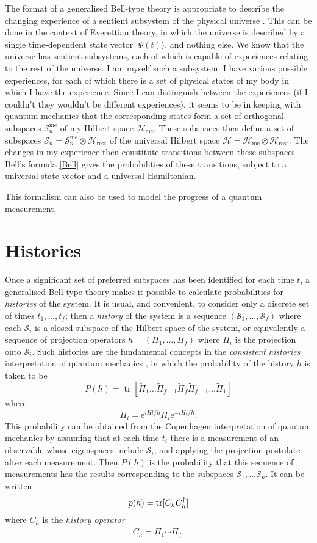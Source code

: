 \documentclass[12pt,a4paper,reqno]{article}
\newcommand{\be}{\begin{equation}}
\newcommand{\ee}{\end{equation}}
\renewcommand{\(}{\left(}
\renewcommand{\)}{\right)}
\renewcommand{\.}{\centerdot}
\newcommand{\e}{\mathrm{e}}
\renewcommand{\S}{\mathcal{S}}
\renewcommand{\H}{\mathcal{H}}
\newcommand{\1}{\mathbf{1}}
\newcommand{\<}{\langle}
\renewcommand{\>}{\rangle}
\newcommand{\tr}{\operatorname{tr}}
\theoremstyle{definition}
\theoremstyle{remark}
\numberwithin{equation}{section}
\newcommand{\Pii}{\widetilde{\Pi}}
\begin{document}
The format of a generalised Bell-type theory is appropriate to describe the changing experience of a sentient subsystem of the physical universe \cite{logicfuture}. This can be done in the context of Everettian theory, in which the universe is described by a single time-dependent state vector $|\Psi(t)\>$, and nothing else. We know that the universe has sentient subsystems, each of which is capable of experiences relating to the rest of the universe. I am myself such a subsystem. I have various possible experiences, for each of which there is a set of physical states of my body in which I have the experience. Since I can distinguish between the experiences (if I couldn't they wouldn't be different experiences), it seems to be in keeping with quantum mechanics that the corresponding states form a set of orthogonal subspaces $\S^{\text{me}}_n$ of my Hilbert space $\H_{\text{me}}$. These subspaces then define a set of subspaces $\S_n = \S_n^{\text{me}}\otimes\H_{\text{rest}}$ of the universal Hilbert space $\H = \H_{\text{me}}\otimes\H_{\text{rest}}$. The changes in my experience then constitute transitions between these subspaces. Bell's formula \eqref{Bell} gives the probabilities of these transitions, subject to a universal state vector and a universal Hamiltonian.

This formalism can also be used \cite{singleworld, Hollowood:classical} to model the progress of a quantum measurement. 

\section{Histories}

Once a significant set of preferred subspaces has been identified for each time $t$, a generalised Bell-type theory makes it possible to calculate probabilities for \emph{histories} of the system. It is usual, and convenient, to consider only a discrete set of times $t_1,\ldots,t_f$; then a \emph{history} of the system is a sequence $(\S_1,\ldots,\S_f)$ where each $\S_i$ is a closed subspace of the Hilbert space of the system, or equivalently a sequence of projection operators $h = (\Pi_1,\ldots,\Pi_f)$ where $\Pi_i$ is the projection onto $\S_i$. Such histories are the fundamental concepts in the \emph{consistent histories} interpretation of quantum mechanics \cite{Griffiths:book}, in which the probability of the history $h$ is taken to be
\be\label{consprob}
P(h) = \tr[\Pii_1\ldots\Pii_{f-1}\Pii_f\Pii_{f-1}\ldots\Pii_1]
\ee
where 
\[
\Pii_i = \e^{iHt/\hbar}\Pi_i\e^{-iHt/\hbar}.
\]
This probability can be obtained from the Copenhagen interpretation of quantum mechanics by assuming that at each time $t_i$ there is a measurement of an observable whose eigenspaces include $\S_i$, and applying the projection postulate after each measurement. Then $P(h)$ is the probability that this sequence of measurements has the results corresponding to the subspaces $\S_1,\ldots\S_n$. It can be written
\[
p(h) = \tr[C_h C_h^\dagger]\notag
\]
where $C_h$ is the \emph{history operator}
\be\label{historyop}
C_h = \Pii_1\cdots\Pii_f.
\ee
\end{document}

